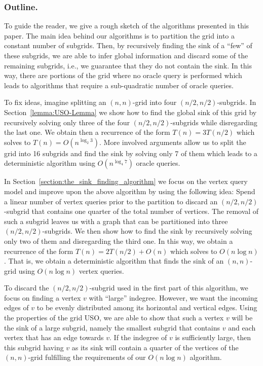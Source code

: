 \documentclass[runningheads,a4paper]{llncs}
\begin{document}
\subsubsection{Outline.}

To guide the reader, we give a rough sketch of the algorithms presented in this paper.
The main idea behind our algorithms is to partition the grid into a constant number of subgrids. 
Then, by recursively finding the sink of a ``few'' of these subgrids, we are able to infer global information and discard some of the remaining subgrids, i.e., we guarantee that they do not contain the sink. 
In this way, there are portions of the grid where no oracle query is performed which leads to algorithms that require a sub-quadratic number of oracle queries.

To fix ideas, imagine splitting an $(n,n)$-grid into four $(n/2, n/2)$-subgrids. 
In Section~\ref{lemma:USO-Lemma} we show how to find the global sink of this grid by recursively solving only three of the four $(n/2, n/2)$-subgrids while disregarding the last one. 
We obtain then a recurrence of the form $T(n) = 3 T(n/2)$ which solves to $T(n) = O(n^{\log_2 3})$.
More involved arguments allow us to split the grid into 16 subgrids and find the sink by solving only 7 of them which leads to a deterministic algorithm using $O(n^{\log_4 7})$ oracle queries.

In Section~\ref{section:the_sink_finding_algorithm} we focus on the vertex query model and improve upon the above algorithm by using the following idea: Spend a linear number of vertex queries prior to the partition to discard an $(n/2, n/2)$-subgrid that contains one quarter of the total number of vertices. 
The removal of such a subgrid leaves us with a graph that can be partitioned into three $(n/2, n/2)$-subgrids. 
We then show how to find the sink by recursively solving only two of them and disregarding the third one. In this way, we obtain a recurrence of the form $T(n) = 2 T(n/2) + O(n)$ which solves to $O(n \log n)$. 
That is, we obtain a deterministic algorithm that finds the sink of an $(n, n)$-grid using $O(n \log n)$ vertex queries. 

To discard the $(n/2, n/2)$-subgrid used in the first part of this algorithm, we focus on finding a vertex $v$ with ``large'' indegree. 
However, we want the incoming edges of $v$ to be evenly distributed among its horizontal and vertical edges. Using the properties of the grid USO, we are able to show that such a vertex $v$ will be the sink of a large subgrid, namely the smallest subgrid that contains $v$ and each vertex that has an edge towards $v$.
If the indegree of $v$ is sufficiently large, then this subgrid having $v$ as its sink will contain a quarter of the vertices of the $(n,n)$-grid fulfilling the requirements of our $O(n \log n)$ algorithm.
\end{document}

